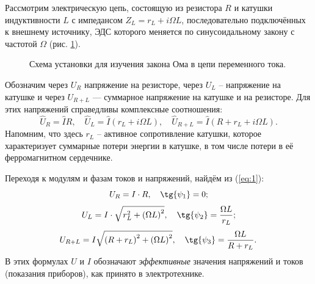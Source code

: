 \documentclass[a4paper,12pt]{article} %
\begin{document}
Рассмотрим электрическую цепь, состоящую из резистора $ R $ и катушки индуктивности $ L $ с импедансом $ Z_L = r_L + i \Omega L $, последовательно подключённых к внешнему источнику, ЭДС которого меняется по синусоидальному закону с частотой $ \Omega $ (рис. \ref{fig:image1}).
\begin{figure}[h]
	\caption{\centering Схема установки для изучения закона Ома в цепи переменного тока.}
	\label{fig:image1}
\end{figure}

Обозначим через $ U_R $ напряжение на резисторе, через $ U_L $ -- напряжение на катушке и через $ U_{R+L} $ — суммарное напряжение на катушке и на резисторе. Для этих напряжений справедливы комплексные соотношения:
\begin{equation}\label{eq:1}
{\widehat U_R} = \widehat IR, \quad {\widehat U_L} = \widehat I\left( {{r_L} + i\Omega L} \right), \quad {\widehat U_{R + L}} = \widehat I\left( {R + {r_L} + i\Omega L} \right).
\end{equation}
Напомним, что здесь $ r_L $ -- активное сопротивление катушки, которое характеризует суммарные потери энергии в катушке, в том числе потери в её ферромагнитном сердечнике.

Переходя к модулям и фазам токов и напряжений, найдём из (\ref{eq:1}):
\begin{equation}\label{eq:2}
{U_R} = I \cdot R, \quad \tg{\psi _1} = 0;
\end{equation}
\begin{equation}\label{eq:3}
{U_L} = I \cdot \sqrt {r_L^2 + {{\left( {\Omega L} \right)}^2}}, \quad \tg{\psi _2} = \frac{{\Omega L}}{{{r_L}}};
\end{equation}
\begin{equation}\label{eq:4}
{U_{R + L}} = I\sqrt {{{\left( {R + {r_L}} \right)}^2} + {{\left( {\Omega L} \right)}^2}}, \quad \tg{\psi _3} = \frac{{\Omega L}}{{R + {r_L}}}.
\end{equation}
В этих формулах $ U $ и $ I $ обозначают \textit{эффективные} значения напряжений и токов (показания приборов), как принято в электротехнике.
\end{document}
